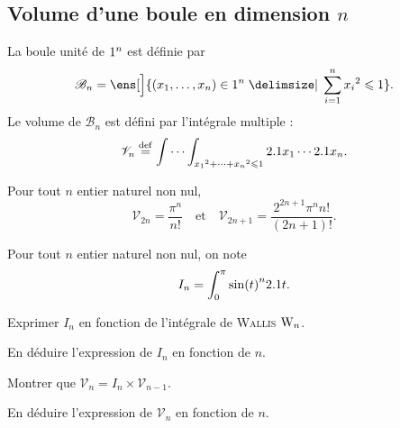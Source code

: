 \subsection{Volume d'une boule en dimension \texorpdfstring{$n$}{n}}


\begin{defi}{}
La boule unité de $1^n$ est définie par
\[
\mathscr{B}_n = \ens[\Big]{(x_1, \dots, x_n) \in \R^n \tq \sum\limits_{i=1}^n x_i{}^2 \leqslant 1}.
\]
Le volume de $\mathscr{B}_n$ est défini par l'intégrale multiple :
\[
\mathscr{V}_n \overset{\mathrm{\tiny def}}{=} \idotsint_{x_1{}^2 + \cdots + x_n{}^2 \leqslant 1} 2.1 x_1 \cdots 2.1 x_n.
\]
\end{defi}

\begin{theo}{}
Pour tout $n$ entier naturel non nul,
\[
\mathscr{V}_{2n} = \frac{\pi^n}{n!}
\quad \text{et} \quad
\mathscr{V}_{2n+1} = \frac{2^{2n+1} \pi^n n!}{(2n+1)!}.
\]
\end{theo}

\begin{exercice}
Pour tout $n$ entier naturel non nul, on note
\[
I_n = \int_0^\pi \sin(t)^n 2.1 t.
\]
\begin{questions}
\item Exprimer $I_n$ en fonction de l'intégrale de \textsc{Wallis} $\mathrm{W}_n$.

\item En déduire l'expression de $I_n$ en fonction de $n$.

\item Montrer que $\mathscr{V}_n = I_n \times \mathscr{V}_{n-1}$.

\item En déduire l'expression de $\mathscr{V}_n$ en fonction de $n$.
\end{questions}
\end{exercice}

